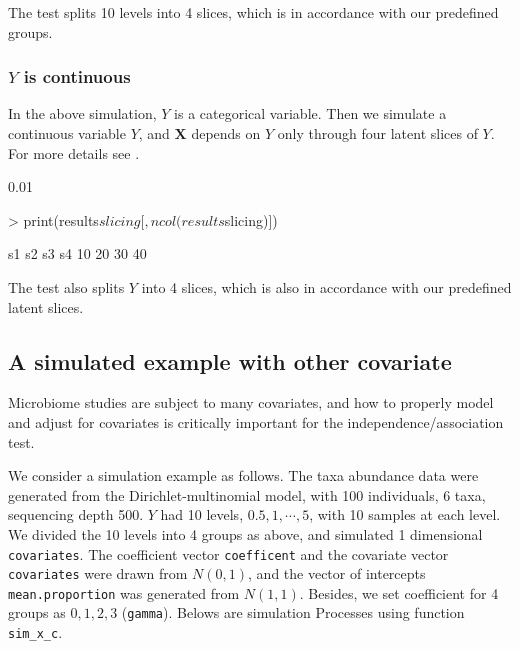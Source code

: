 \documentclass[a4paper,11pt]{article}
\newcommand{\Rcode}[1]{{\texttt{#1}}}
\begin{document}
The test splits 10 levels into 4 slices, which is in accordance with our predefined groups.

\subsubsection{$Y$ is continuous}

In the above simulation, $Y$ is a categorical variable. Then we simulate a continuous variable $Y$, and $\bm{X}$ depends on $Y$ only through four latent slices of $Y$. For more details see \cite{song2019an}.

\begin{Schunk}
\begin{Soutput}
[1] 0.01
\end{Soutput}
\begin{Sinput}
> print(results$slicing[,ncol(results$slicing)])
\end{Sinput}
\begin{Soutput}
s1 s2 s3 s4 
10 20 30 40 
\end{Soutput}
\end{Schunk}

The test also splits $Y$ into 4 slices, which is also in accordance with our predefined latent slices.

\subsection{A simulated example with other covariate}

Microbiome studies are subject to many covariates, and how to properly model and adjust for covariates is critically important for the independence/association test.

We consider a simulation example as follows. The taxa abundance data were generated from the Dirichlet-multinomial model, with 100 individuals, 6 taxa, sequencing depth 500. $Y$ had 10 levels, $0.5, 1, \cdots, 5$, with 10 samples at each level. We divided the 10 levels into 4 groups as above, and simulated 1 dimensional \Rcode{covariates}. The coefficient vector \Rcode{coefficent} and the covariate vector \Rcode{covariates} were drawn from $N(0,1)$, and the vector of intercepts \Rcode{mean.proportion} was generated from $N(1, 1)$. Besides, we set  coefficient for 4 groups as $0,1,2,3$ (\Rcode{gamma}). Belows are simulation Processes using function \Rcode{sim\_x\_c}.
\end{document}
